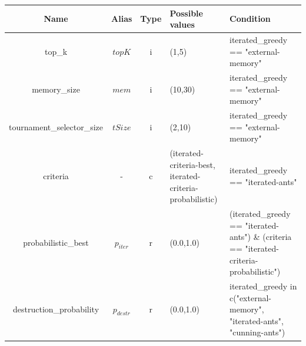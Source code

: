 \documentclass[12pt,a4paper,oneside]{book}
\begin{document}
\begin{table}[]
\centering
\begin{tabular}{|c|c|c|p{4cm}|p{4cm}|}
\hline
\textbf{Name}  & \textbf{Alias}      & \textbf{Type} & \textbf{Possible values}                                                                & \textbf{Condition}                                                                                     \\ \hline
top\_k                          & $topK$     & i    & (1,5)                                                                          & iterated\_greedy == "external-memory"                                                         \\ \hline
memory\_size                    & $mem$      & i    & (10,30)                                                                        & iterated\_greedy == "external-memory"                                                         \\ \hline
tournament\_selector\_size      & $tSize$    & i    & (2,10)                                                                         & iterated\_greedy == "external-memory"                                                         \\ \hline
criteria                        & -          & c    & (iterated-criteria-best, iterated-criteria-probabilistic)                       & iterated\_greedy	== "iterated-ants"                                                           \\ \hline
probabilistic\_best             & $p_{iter}$ & r    & (0.0,1.0)                                                                      & (iterated\_greedy == "iterated-ants") \& (criteria == "iterated-criteria-probabilistic")       \\ \hline
destruction\_probability        & $p_{destr}$  &  r & (0.0,1.0)                                                                      & iterated\_greedy in c("external-memory", "iterated-ants", "cunning-ants")                     \\ \hline
\end{tabular}
\end{table}
\end{document}
